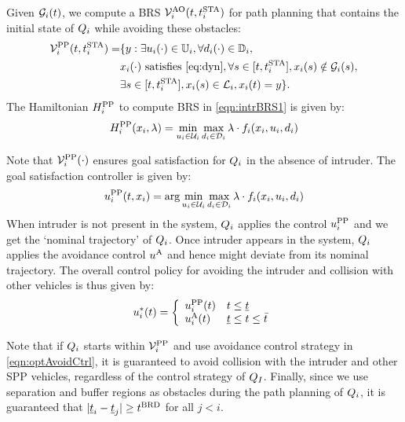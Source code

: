 Given $\mathcal{G}_i(t)$, we compute a BRS $\mathcal{V}^{\text{AO}}_{i}(t, t^\text{STA}_i)$ for path planning that contains the initial state of $Q_i$ while avoiding these obstacles:
\begin{equation} \label{eqn:intrBRS1}
\begin{aligned}
\brs^{\text{PP}}_{i}(t, \sta_i) = & \{y: \exists \ctrl_i(\cdot) \in \cfset_i, \forall \dstb_i(\cdot) \in \dfset_i, \\
& \state_i(\cdot) \text{ satisfies \eqref{eq:dyn}}, \forall s \in [t, \sta_i], \state_i(s) \notin \obsset_i(s), \\
& \exists s \in [t, \sta_i], \state_i(s) \in \targetset_i, \state_i(t) = y \}.
\end{aligned}
\end{equation}
The Hamiltonian $H^{\text{PP}}_{i}$ to compute BRS in \eqref{eqn:intrBRS1} is given by:
\begin{equation} \label{eqn:BRSham}
\ham^{\text{PP}}_{i}(\state_i, \costate) = \min_{\ctrl_i \in \cset_i} \max_{\dstb_i \in \dset_i} \costate \cdot f_i (\state_i, \ctrl_i, \dstb_i)
\end{equation}

Note that $\mathcal{V}^{\text{PP}}_{i}(\cdot)$ ensures goal satisfaction for $Q_i$ in the absence of intruder. The goal satisfaction controller is given by:
\begin{equation} \label{eqn:PPPolicy}
{\ctrl^{\text{PP}}_{i}}(t, \state_i) = \arg \min_{\ctrl_i \in \cset_i} \max_{\dstb_i \in \dset_i} \costate \cdot f_i (\state_i, \ctrl_i, \dstb_i)
\end{equation}
When intruder is not present in the system, $Q_i$ applies the control ${u^{\text{PP}}_{i}}$ and we get the `nominal trajectory' of $Q_i$. Once intruder appears in the system, $Q_i$ applies the avoidance control ${u^{\text{A}}}$ and hence might deviate from its nominal trajectory. The overall control policy for avoiding the intruder and collision with other vehicles is thus given by:
\begin{equation*}
{u^*_{i}}(t) = 
\left \{ 
\begin{array}{ll}
{u^{\text{PP}}_{i}}(t) & t \leq \underline{t}\\
{u^{\text{A}}_{i}}(t) & \underline{t}\leq t \leq \bar{t}
\end{array}
\right.
\end{equation*}

Note that if $Q_i$ starts within $\mathcal{V}^{\text{PP}}_{i}$ and use avoidance control strategy in \eqref{eqn:optAvoidCtrl}, it is guaranteed to avoid collision with the intruder and other SPP vehicles, regardless of the control strategy of $Q_{I}$. Finally, since we use separation and buffer regions as obstacles during the path planning of $Q_i$, it is guaranteed that $|\underline{t}_i - \underline{t}_j| \geq t^\text{BRD}$ for all $j < i$. 

